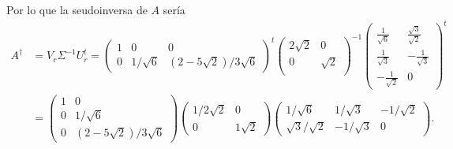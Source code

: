 \documentclass[11pt,letterpaper]{article}
\begin{document}
\begin{enumerate}
Por lo que la seudoinversa de $A$ sería  
\begin{align*}
A^\dagger &= V_r\Sigma^{-1} U_r^t=\begin{pmatrix}
1 & 0 & 0\\ 
0 &  1/\sqrt{6} & (2-5\sqrt{2})/3\sqrt{6}
\end{pmatrix}^t \begin{pmatrix}
2\sqrt{2} & 0\\
0 & \sqrt{2} \\
\end{pmatrix}^{-1}\begin{pmatrix}
\frac{1}{\sqrt{6}} & \frac{\sqrt{3}}{\sqrt{2}} \\
\frac{1}{\sqrt{3}} & -\frac{1}{\sqrt{3}} \\
-\frac{1}{\sqrt{2}} & 0 
\end{pmatrix}^t\\
&= \begin{pmatrix}
1 &0\\
0 & 1/\sqrt{6}\\
0 & (2-5\sqrt{2})/3\sqrt{6}
\end{pmatrix} \begin{pmatrix}
1/2\sqrt{2} & 0\\
0 & 1\sqrt{2}
\end{pmatrix} \begin{pmatrix}
1/\sqrt{6} & 1/\sqrt{3} & -1/\sqrt{2}\\
\sqrt{3} /\sqrt{2} & -1/\sqrt{3} & 0
\end{pmatrix}.
\end{align*}


\end{enumerate}
\end{document}
